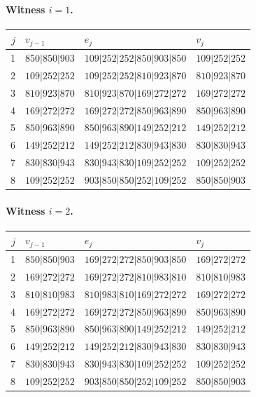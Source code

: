 \paragraph{Witness \(i=1\).}
\begin{center}
\small
\begin{tabular}{rlll}
\hline
\(j\)&\(v_{j-1}\)&\(e_j\)&\(v_j\)\\
\hline
1&\(850|850|903\)&\(109|252|252|850|903|850\)&\(109|252|252\)\\
2&\(109|252|252\)&\(109|252|252|810|923|870\)&\(810|923|870\)\\
3&\(810|923|870\)&\(810|923|870|169|272|272\)&\(169|272|272\)\\
4&\(169|272|272\)&\(169|272|272|850|963|890\)&\(850|963|890\)\\
5&\(850|963|890\)&\(850|963|890|149|252|212\)&\(149|252|212\)\\
6&\(149|252|212\)&\(149|252|212|830|943|830\)&\(830|830|943\)\\
7&\(830|830|943\)&\(830|943|830|109|252|252\)&\(109|252|252\)\\
8&\(109|252|252\)&\(903|850|850|252|109|252\)&\(850|850|903\)\\
\hline
\end{tabular}
\end{center}

\paragraph{Witness \(i=2\).}
\begin{center}
\small
\begin{tabular}{rlll}
\hline
\(j\)&\(v_{j-1}\)&\(e_j\)&\(v_j\)\\
\hline
1&\(850|850|903\)&\(169|272|272|850|903|850\)&\(169|272|272\)\\
2&\(169|272|272\)&\(169|272|272|810|983|810\)&\(810|810|983\)\\
3&\(810|810|983\)&\(810|983|810|169|272|272\)&\(169|272|272\)\\
4&\(169|272|272\)&\(169|272|272|850|963|890\)&\(850|963|890\)\\
5&\(850|963|890\)&\(850|963|890|149|252|212\)&\(149|252|212\)\\
6&\(149|252|212\)&\(149|252|212|830|943|830\)&\(830|830|943\)\\
7&\(830|830|943\)&\(830|943|830|109|252|252\)&\(109|252|252\)\\
8&\(109|252|252\)&\(903|850|850|252|109|252\)&\(850|850|903\)\\
\hline
\end{tabular}
\end{center}

